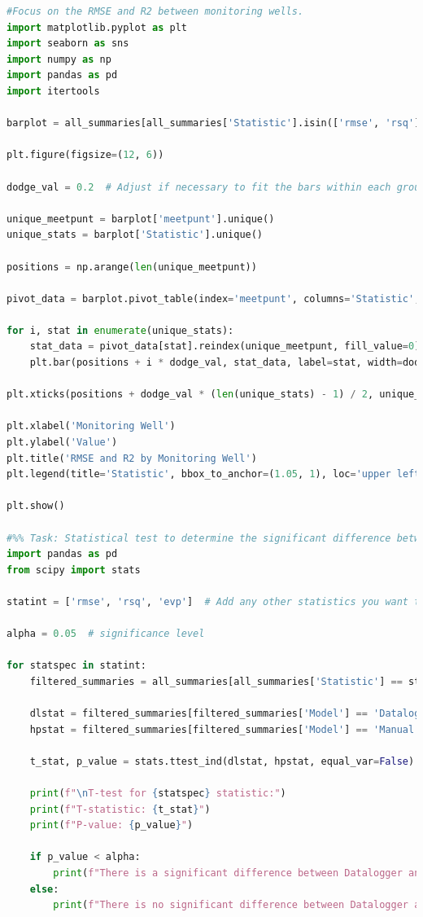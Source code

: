 \begin{lstlisting}[language=Python]
#Focus on the RMSE and R2 between monitoring wells. 
import matplotlib.pyplot as plt
import seaborn as sns
import numpy as np
import pandas as pd
import itertools

barplot = all_summaries[all_summaries['Statistic'].isin(['rmse', 'rsq'])]

plt.figure(figsize=(12, 6))

dodge_val = 0.2  # Adjust if necessary to fit the bars within each group

unique_meetpunt = barplot['meetpunt'].unique()
unique_stats = barplot['Statistic'].unique()

positions = np.arange(len(unique_meetpunt))

pivot_data = barplot.pivot_table(index='meetpunt', columns='Statistic', values='Value', aggfunc=np.mean, fill_value=0)

for i, stat in enumerate(unique_stats):
    stat_data = pivot_data[stat].reindex(unique_meetpunt, fill_value=0)
    plt.bar(positions + i * dodge_val, stat_data, label=stat, width=dodge_val)

plt.xticks(positions + dodge_val * (len(unique_stats) - 1) / 2, unique_meetpunt, rotation=45)

plt.xlabel('Monitoring Well')
plt.ylabel('Value')
plt.title('RMSE and R2 by Monitoring Well')
plt.legend(title='Statistic', bbox_to_anchor=(1.05, 1), loc='upper left')

plt.show()

#%% Task: Statistical test to determine the significant difference between 'Datalogger' and 'Manual'. 
import pandas as pd
from scipy import stats

statint = ['rmse', 'rsq', 'evp']  # Add any other statistics you want to test

alpha = 0.05  # significance level

for statspec in statint:
    filtered_summaries = all_summaries[all_summaries['Statistic'] == statspec]

    dlstat = filtered_summaries[filtered_summaries['Model'] == 'Datalogger']['Value']
    hpstat = filtered_summaries[filtered_summaries['Model'] == 'Manual']['Value']

    t_stat, p_value = stats.ttest_ind(dlstat, hpstat, equal_var=False)  # Welch's t-test

    print(f"\nT-test for {statspec} statistic:")
    print(f"T-statistic: {t_stat}")
    print(f"P-value: {p_value}")

    if p_value < alpha:
        print(f"There is a significant difference between Datalogger and Manual for the {statspec} statistic (p < {alpha}).")
    else:
        print(f"There is no significant difference between Datalogger and Manual for the {statspec} statistic (p >= {alpha}).")


\end{lstlisting}
